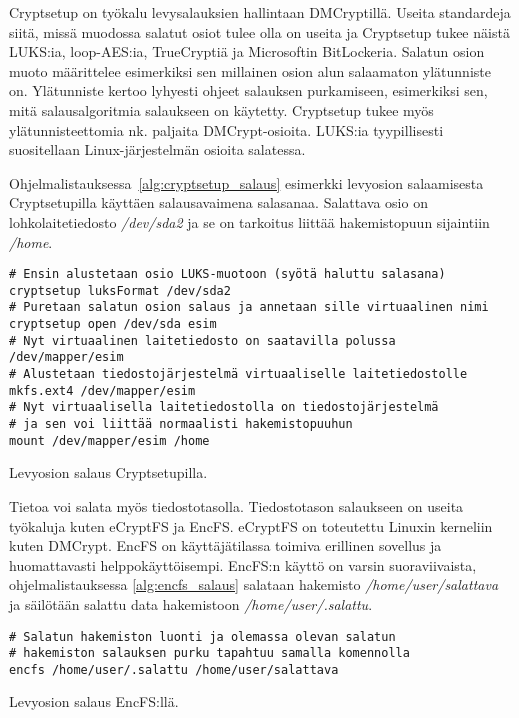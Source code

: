 Cryptsetup on työkalu levysalauksien hallintaan DMCryptillä. Useita standardeja siitä, missä muodossa salatut osiot tulee olla on useita ja Cryptsetup tukee näistä LUKS:ia, loop-AES:ia, TrueCryptiä ja Microsoftin BitLockeria. Salatun osion muoto määrittelee esimerkiksi sen millainen osion alun salaamaton ylätunniste on. Ylätunniste kertoo lyhyesti ohjeet salauksen purkamiseen, esimerkiksi sen, mitä salausalgoritmia salaukseen on käytetty. Cryptsetup tukee myös ylätunnisteettomia nk. paljaita DMCrypt-osioita. LUKS:ia tyypillisesti suositellaan Linux-järjestelmän osioita salatessa.

Ohjelmalistauksessa~\ref{alg:cryptsetup_salaus} esimerkki levyosion salaamisesta Cryptsetupilla käyttäen salausavaimena salasanaa. Salattava osio on lohkolaitetiedosto \textit{/dev/sda2} ja se on tarkoitus liittää hakemistopuun sijaintiin \textit{/home}.~\cite{cryptsetup}

\begin{algorithm}[tbh]
\begin{verbatim}
# Ensin alustetaan osio LUKS-muotoon (syötä haluttu salasana)
cryptsetup luksFormat /dev/sda2
# Puretaan salatun osion salaus ja annetaan sille virtuaalinen nimi
cryptsetup open /dev/sda esim
# Nyt virtuaalinen laitetiedosto on saatavilla polussa /dev/mapper/esim
# Alustetaan tiedostojärjestelmä virtuaaliselle laitetiedostolle
mkfs.ext4 /dev/mapper/esim
# Nyt virtuaalisella laitetiedostolla on tiedostojärjestelmä
# ja sen voi liittää normaalisti hakemistopuuhun
mount /dev/mapper/esim /home
\end{verbatim}
\caption{Levyosion salaus Cryptsetupilla.\label{alg:cryptsetup_salaus}}
\end{algorithm}
\newpage{}

Tietoa voi salata myös tiedostotasolla. Tiedostotason salaukseen on useita työkaluja kuten eCryptFS ja EncFS. eCryptFS on toteutettu Linuxin kerneliin kuten DMCrypt. EncFS on käyttäjätilassa toimiva erillinen sovellus ja huomattavasti helppokäyttöisempi. EncFS:n käyttö on varsin suoraviivaista, ohjelmalistauksessa \ref{alg:encfs_salaus} salataan hakemisto \textit{/home/user/salattava} ja säilötään salattu data hakemistoon \textit{/home/user/.salattu}.~\cite{encfs}

\begin{algorithm}[tbh]
\begin{verbatim}
# Salatun hakemiston luonti ja olemassa olevan salatun
# hakemiston salauksen purku tapahtuu samalla komennolla
encfs /home/user/.salattu /home/user/salattava
\end{verbatim}
\caption{Levyosion salaus EncFS:llä.\label{alg:encfs_salaus}}
\end{algorithm}
\newpage{}

